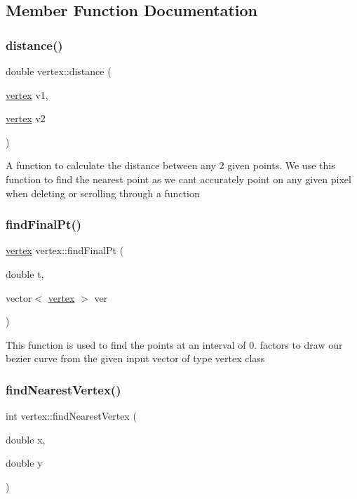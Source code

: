 \subsection{Member Function Documentation}
\mbox{\label{classvertex_a805e0de0af85470e4fbf698d71e6c122}} 
\subsubsection{\texorpdfstring{distance()}{distance()}}
{\footnotesize\ttfamily double vertex\+::distance (\begin{DoxyParamCaption}\item[{\hyperlink{classvertex}{vertex}}]{v1,  }\item[{\hyperlink{classvertex}{vertex}}]{v2 }\end{DoxyParamCaption})}

A function to calculate the distance between any 2 given points. We use this function to find the nearest point as we can\textquotesingle{}t accurately point on any given pixel when deleting or scrolling through a function \mbox{\label{classvertex_a458b661ebfaf61213b56808fa0b3547f}} 
\subsubsection{\texorpdfstring{find\+Final\+Pt()}{findFinalPt()}}
{\footnotesize\ttfamily \hyperlink{classvertex}{vertex} vertex\+::find\+Final\+Pt (\begin{DoxyParamCaption}\item[{double}]{t,  }\item[{vector$<$ \hyperlink{classvertex}{vertex} $>$}]{ver }\end{DoxyParamCaption})}

This function is used to find the points at an interval of 0. factors to draw our bezier curve from the given input vector of type vertex class \mbox{\label{classvertex_a2e1c5ac0589fae95a9e62f6685037fe6}} 
\subsubsection{\texorpdfstring{find\+Nearest\+Vertex()}{findNearestVertex()}}
{\footnotesize\ttfamily int vertex\+::find\+Nearest\+Vertex (\begin{DoxyParamCaption}\item[{double}]{x,  }\item[{double}]{y }\end{DoxyParamCaption})}


